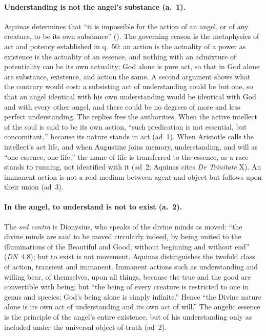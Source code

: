 \paragraph{Understanding is not the angel's substance (a.~1).} Aquinas
determines that ``it is impossible for the action of an angel, or of any
creature, to be its own substance'' (). The
governing reason is the metaphysics of act and potency established in
q.~50: an action is the actuality of a power as existence is the actuality
of an essence, and nothing with an admixture of potentiality can be its
own actuality; God alone is pure act, so that in God alone are substance,
existence, and action the same. A second argument shows what the contrary
would cost: a subsisting act of understanding could be but one, so that an
angel identical with his own understanding would be identical with God and
with every other angel, and there could be no degrees of more and less
perfect understanding. The replies free the authorities. When the active
intellect of the soul is said to be its own action, ``such predication is
not essential, but concomitant,'' because its nature stands in act
(ad~1). When Aristotle
calls the intellect's act life, and when Augustine joins memory,
understanding, and will as ``one essence, one life,'' the name of life is
transferred to the essence, as a race stands to running, not identified
with it (ad~2; Aquinas cites \emph{De Trinitate} X). An immanent action is
not a real medium between agent and object but follows upon their union
(ad~3).

\paragraph{In the angel, to understand is not to exist (a.~2).} The
\emph{sed contra} is Dionysius, who speaks of the divine minds as moved:
``the divine minds are said to be moved circularly indeed, by being united
to the illuminations of the Beautiful and Good, without beginning and
without end'' (\emph{DN}~4.8); but to exist is not movement. Aquinas
distinguishes the twofold class of action, transient and immanent.
Immanent actions such as understanding and willing bear, of themselves,
upon all things, because the true and the good are convertible with being;
but ``the being of every creature is restricted to one in genus and
species; God's being alone is simply infinite.'' Hence ``the Divine nature
alone is its own act of understanding and its own act of will.'' The
angelic essence is the principle of the angel's entire existence, but of
his understanding only as included under the universal object of truth
(ad~2).

